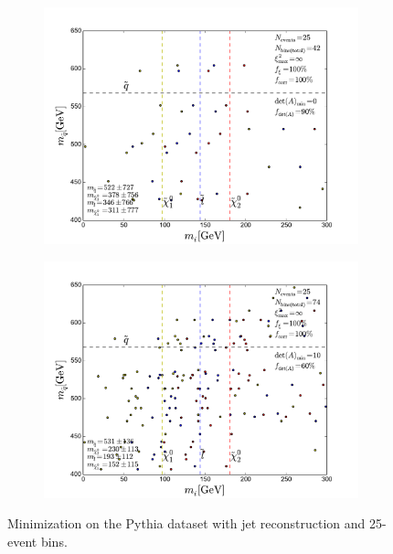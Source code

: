 \documentclass[twoside,english]{uiofysmaster}
\begin{document}
\begin{figure}[hbt]
	\centering
	\begin{subfigure}[b]{0.6\textwidth}
		\includegraphics[width=\textwidth]{figures/improving_combinatorics/pythia_jetrec_25evbins_nodetAcut-nosmear_TMP.pdf} 
		\caption{ }
		\label{fig:event-pair-A-selection_pythia_4combosum-jetrec-OSFL-25events_a}
	\end{subfigure}

	\begin{subfigure}[b]{0.6\textwidth}
		\includegraphics[width=\textwidth]{figures/improving_combinatorics/pythia_jetrec_25evbins_detAcut10-nosmear_TMP.pdf}
		\caption{ }
		\label{fig:event-pair-A-selection_pythia_4combosum-jetrec-OSFL-25events_b} 
	\end{subfigure}
	\caption{Minimization on the Pythia dataset with jet reconstruction and 25-event bins.}
	\label{fig:event-pair-A-selection_pythia_4combosum-jetrec-OSFL-25events}
\end{figure}
\end{document}
